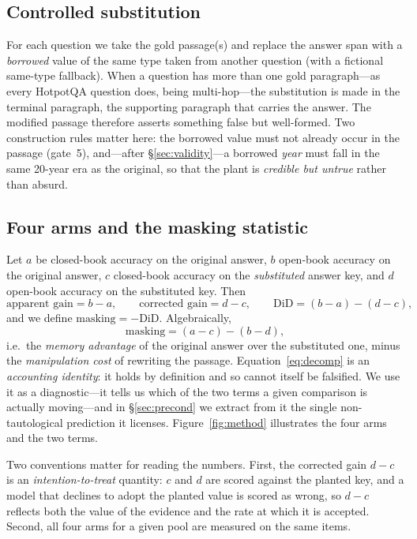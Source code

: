 \documentclass[11pt]{article}
\newcommand{\mask}{\ensuremath{\mathrm{masking}}}
\begin{document}
\subsection{Controlled substitution}
For each question we take the gold passage(s) and replace the answer span with a
\emph{borrowed} value of the same type taken from another question (with a fictional
same-type fallback). When a question has more than one gold paragraph---as every HotpotQA
question does, being multi-hop---the substitution is made in the terminal paragraph, the
supporting paragraph that carries the answer.
The modified passage therefore asserts something false but
well-formed. Two construction rules matter here: the borrowed value must not already occur
in the passage (gate~5), and---after \S\ref{sec:validity}---a borrowed
\emph{year} must fall in the same 20-year era as the original, so that the plant is
\emph{credible but untrue} rather than absurd.

\subsection{Four arms and the masking statistic}
Let $a$ be closed-book accuracy on the original answer, $b$ open-book accuracy on the
original answer, $c$ closed-book accuracy on the \emph{substituted} answer key, and $d$
open-book accuracy on the substituted key. Then
\begin{equation}
\text{apparent gain} = b-a,\qquad
\text{corrected gain} = d-c,\qquad
\mathrm{DiD} = (b-a)-(d-c),
\end{equation}
and we define $\mask = -\mathrm{DiD}$. Algebraically,
\begin{equation}
\label{eq:decomp}
\mask = (a-c) - (b-d),
\end{equation}
i.e.\ the \emph{memory advantage} of the original answer over the substituted one, minus
the \emph{manipulation cost} of rewriting the passage. Equation~\eqref{eq:decomp} is an
\emph{accounting identity}: it holds by definition and so cannot itself be falsified. We use
it as a diagnostic---it tells us which of the two terms a given comparison is actually
moving---and in \S\ref{sec:precond} we extract from it the single non-tautological prediction
it licenses. Figure~\ref{fig:method} illustrates the four arms and the two terms.

Two conventions matter for reading the numbers. First, the corrected gain $d-c$ is an
\emph{intention-to-treat} quantity: $c$ and $d$ are scored against the planted key, and a
model that declines to adopt the planted value is scored as wrong, so $d-c$ reflects both
the value of the evidence and the rate at which it is accepted. Second, all four arms for a
given pool are measured on the same items.
\end{document}
